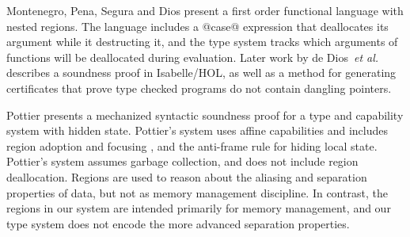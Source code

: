 Montenegro, Pena, Segura and Dios  present a first order functional language with nested regions. The language includes a @case@ expression that deallocates its argument while it destructing it, and the type system tracks which arguments of functions will be deallocated during evaluation. Later work by de Dios~\emph{et al.}~ describes a soundness proof in Isabelle/HOL, as well as a method for generating certificates that prove type checked programs do not contain dangling pointers.


Pottier  presents a mechanized syntactic soundness proof for a type and capability system with hidden state. Pottier's system uses affine capabilities and includes region adoption and focusing \cite{Fahndrich:adoption-focus}, and the anti-frame rule \cite{Pottier:anti-frame} for hiding local state. Pottier's system assumes garbage collection, and does not include region deallocation. Regions are used to reason about the aliasing and separation properties of data, but not as memory management discipline. In contrast, the regions in our system are intended primarily for memory management, and our type system does not encode the more advanced separation properties.

